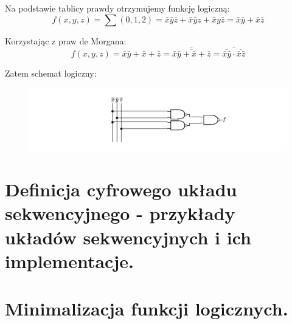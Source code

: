 \documentclass[12pt]{article}
\begin{document}
    Na podstawie tablicy prawdy otrzymujemy funkcję logiczną:
    \[f(x,y,z) = \sum (0,1,2) = \bar{x} \bar{y} \bar{z} + \bar{x} \bar{y} z + \bar{x} y \bar{z} = \bar{x} \bar{y} + \bar{x} \bar{z}\]

    Korzystając z praw de Morgana:
    \[f(x,y,z) = \bar{x} \bar{y} + \bar{x} + \bar{z} = \overline{\overline{\bar{x} \bar{y} + \bar{x} + \bar{z}}} = \overline{\overline{\bar{x} \bar{y}} \cdot \overline{\bar{x} \bar{z}}} \]

    Zatem schemat logiczny:

    \begin{figure}[H]
        \includegraphics[width=\linewidth]{uk_ex.png}
    \end{figure}

    \newpage

    \section{Definicja cyfrowego układu sekwencyjnego - przykłady układów sekwencyjnych i ich implementacje.}

	\newpage

    \section{Minimalizacja funkcji logicznych.}
\end{document}
